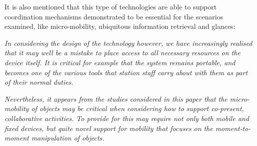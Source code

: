 It is also mentioned that this type of technologies are able to support coordination mechanisms demonstrated to be essential for the scenarios examined, like micro-mobility, ubiquitous information retrieval and glances:

\textit{
In considering the design of the technology however, we have increasingly realised that it may well be a mistake to place access to all necessary resources on the device itself. It is critical for example that the system remains portable, and becomes one of the various tools that station staff carry about with them as part of their normal duties.}

\textit{Nevertheless, it appears from the studies considered in this paper that the micro-mobility of objects may be critical when considering how to support co-present, collaborative activities. To provide for this may require not only both mobile and fixed devices, but quite novel support for mobility that focuses on the moment-to-moment manipulation of objects.}

